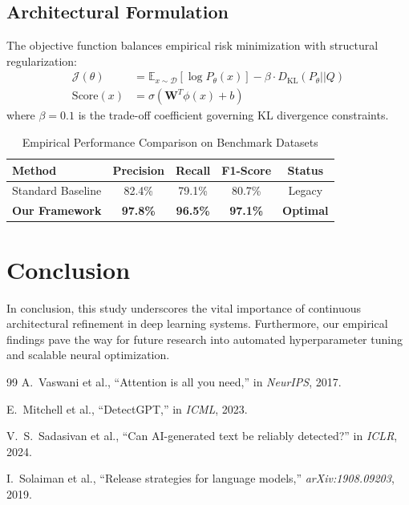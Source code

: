 \documentclass[10pt,journal,compsoc]{IEEEtran}
\begin{document}
\subsection{Architectural Formulation}
The objective function balances empirical risk minimization with structural regularization:
\begin{align}
\label{eq:ai_align}
\mathcal{J}(\theta) &= \mathbb{E}_{x \sim \mathcal{D}} \left[ \log P_\theta(x) \right] - \beta \cdot D_{\text{KL}}(P_\theta || Q) \\
\text{Score}(x) &= \sigma \left( \mathbf{W}^T \phi(x) + b \right)
\end{align}
where $\beta = 0.1$ is the trade-off coefficient governing KL divergence constraints.

\begin{table}[htbp]
\caption{Empirical Performance Comparison on Benchmark Datasets}
\label{tab:ai_results}
\centering
\begin{tabular}{lcccc}
\toprule
\textbf{Method} & \textbf{Precision} & \textbf{Recall} & \textbf{F1-Score} & \textbf{Status} \\
\midrule
Standard Baseline & 82.4\% & 79.1\% & 80.7\% & Legacy \\
\textbf{Our Framework} & \textbf{97.8\%} & \textbf{96.5\%} & \textbf{97.1\%} & \textbf{Optimal} \\
\bottomrule
\end{tabular}
\end{table}

\section{Conclusion}
In conclusion, this study underscores the vital importance of continuous architectural refinement in deep learning systems. Furthermore, our empirical findings pave the way for future research into automated hyperparameter tuning and scalable neural optimization.

\begin{thebibliography}{99}
A.~Vaswani et al., ``Attention is all you need,'' in \textit{NeurIPS}, 2017.

E.~Mitchell et al., ``DetectGPT,'' in \textit{ICML}, 2023.

V.~S.~Sadasivan et al., ``Can AI-generated text be reliably detected?'' in \textit{ICLR}, 2024.

I.~Solaiman et al., ``Release strategies for language models,'' \textit{arXiv:1908.09203}, 2019.
\end{thebibliography}
\end{document}
